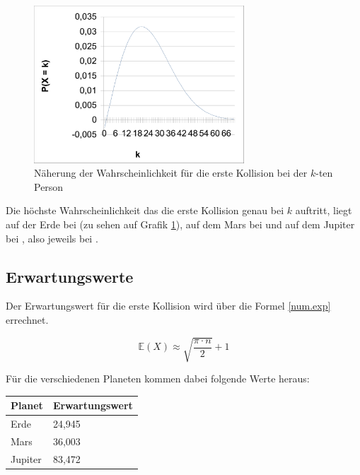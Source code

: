 \documentclass[../main.tex]{subfiles}
\begin{document}
    \begin{figure}[h]
        \begin{center}
            \includegraphics[width=0.7\textwidth]{../graphics/peq.png}
        \end{center}
        \caption{\label{num.fpeqe} Näherung der Wahrscheinlichkeit für die erste Kollision bei der $k$-ten Person}
    \end{figure}



    Die höchste Wahrscheinlichkeit das die erste Kollision genau bei $k$ auftritt, liegt auf der Erde bei  (zu sehen auf Grafik \ref{num.fpeqe}), auf dem Mars bei  und auf dem Jupiter bei , also jeweils bei .

    \subsection{Erwartungswerte}

    Der Erwartungswert für die erste Kollision wird über die Formel \ref{num.exp} errechnet.

    \begin{equation}
        \mathbb{E}(X) \approx \sqrt{ \frac{ \pi \cdot n }{ 2 } } + 1
        \label{num.exp}
    \end{equation}

    Für die verschiedenen Planeten kommen dabei folgende Werte heraus:

    \begin{center}
        \begin{tabular}{|l|l|}
            \hline
            \textbf{Planet} & \textbf{Erwartungswert} \\ \hline
            Erde            & 24,945                  \\ \hline
            Mars            & 36,003                  \\ \hline
            Jupiter         & 83,472                  \\ \hline
        \end{tabular}
    \end{center}
\end{document}
